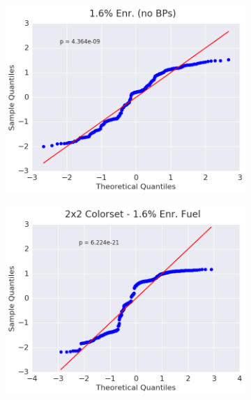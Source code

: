 \begin{figure}[h!]
\centering
\begin{subfigure}{0.5\textwidth}
  \centering
  \includegraphics[width=\linewidth]{figures/patterns/assm-1.6/quantile/assm-16-fiss-2}
  \caption{}
  \label{fig:chap9-qq-assm-1.6-fiss}
\end{subfigure}%
\begin{subfigure}{0.5\textwidth}
  \centering
  \includegraphics[width=\linewidth]{figures/patterns/2x2/quantile/16-enr-fiss-2}
  \caption{}
  \label{fig:chap9-qq-2x2-1.6-fiss}
\end{subfigure}
\begin{subfigure}{0.5\textwidth}

\end{subfigure}
\end{figure}
